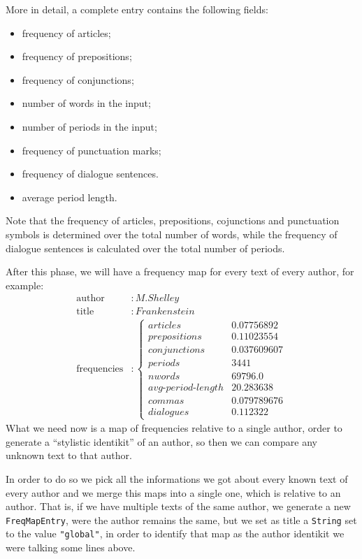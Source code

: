 \documentclass[a4paper,11pt, twoside]{article}
\begin{document}
	More in detail, a complete entry contains the following fields: \begin{itemize}
		\item frequency of articles;
		\item frequency of prepositions;
		\item frequency of conjunctions;
		\item number of words in the input;
		\item number of periods in the input;
		\item frequency of punctuation marks;
		\item frequency of dialogue sentences.
		\item average period length.
	\end{itemize}

	Note that the frequency of articles, prepositions, cojunctions and punctuation symbols is determined over the total number of words, while the frequency of dialogue sentences is calculated over the total number of periods.
	
	After this phase, we will have a frequency map for every text of every author, for example: \begin{align*}
		\text{author}&: M. Shelley \\
		\text{title} &: Frankenstein \\
		\text{frequencies}&:\begin{cases}
			articles &0.07756892 \\
			prepositions &0.11023554 \\
			conjunctions &0.037609607 \\
			periods &3441 \\
			nwords &69796.0 \\
			avg\text{-}period\text{-}length &20.283638 \\
			commas &0.079789676 \\
			dialogues &0.112322
		\end{cases}
	\end{align*}
	 What we need now is a map of frequencies relative to a single author, order to generate a ``stylistic identikit''  of an author, so then we can compare any unknown text to that author.
	 
	 In order to do so we pick all the informations we got about every known text of every author and we merge this maps into a single one, which is relative to an author. That is, if we have multiple texts of the same author, we generate a new \lstinline|FreqMapEntry|, were the author remains the same, but we set as title a \lstinline|String| set to the value \lstinline|"global"|, in order to identify that map as the author identikit we were talking some lines above.
	 
\end{document}

